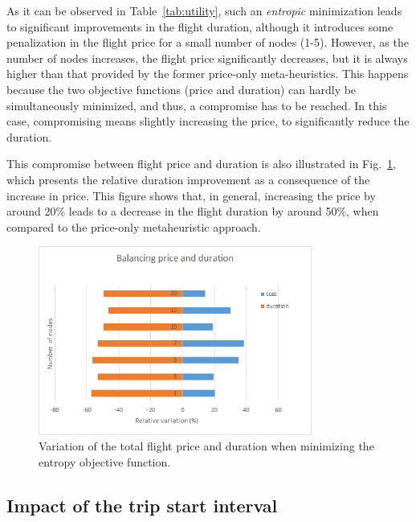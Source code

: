 
As it can be observed in Table~\ref{tab:utility}, such an \textit{entropic} minimization leads to significant improvements in the flight duration, although it introduces some penalization in the flight price for a small number of nodes (1-5). However, as the number of nodes increases, the flight price significantly decreases, but it is always higher than that provided by the former price-only meta-heuristics. This happens because the two objective functions (price and duration) can hardly be simultaneously minimized, and thus, a compromise has to be reached. In this case, compromising means slightly increasing the price, to significantly reduce the duration.

This compromise between flight price and duration is also illustrated in Fig.~\ref{fig:cost_vs_time}, which presents the relative duration improvement as a consequence of the increase in price. This figure shows that, in general, increasing the price by around 20\% leads to a decrease in the flight duration by around 50\%, when compared to the price-only metaheuristic approach.

\begin{figure}
  \centering
  \includegraphics[width=9cm]{./imgs/cost_vs_time.png}
  \caption{Variation of the total flight price and duration when minimizing the entropy objective function.}
  \label{fig:cost_vs_time}  
\end{figure}

\subsection{Impact of the trip start interval}
\label{sec:start_impact}

